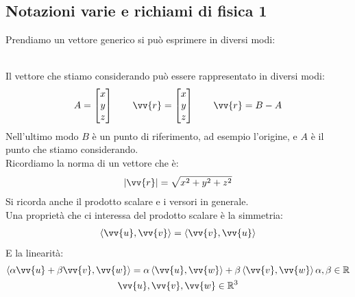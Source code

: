 \documentclass[a4paper, oneside]{article}
\begin{document}
\subsection{Notazioni varie e richiami di fisica 1}
Prendiamo un vettore generico si può esprimere in diversi modi:\\
\hfill\\
Il vettore che stiamo considerando può essere rappresentato in diversi modi:
\begin{gather*}
    A = \begin{bmatrix}
        x\\
        y\\
        z
    \end{bmatrix}\qquad
    \vv{r} = \begin{bmatrix}
        x\\
        y\\
        z
    \end{bmatrix}\qquad
    \vv{r} = B - A
\end{gather*}
Nell'ultimo modo $B$ è un punto di riferimento, ad esempio l'origine, e $A$ è il punto che stiamo considerando.\\
Ricordiamo la norma di un vettore che è:
\begin{gather*}
    |\vv{r}| = \sqrt{x^2 + y^2 + z^2}
\end{gather*}
Si ricorda anche il prodotto scalare e i versori in generale.\\
Una proprietà che ci interessa del prodotto scalare è la simmetria:
\begin{gather*}
    \left\langle \vv{u} , \vv{v} \right\rangle = \left\langle \vv{v} , \vv{u} \right\rangle
\end{gather*}
E la linearità:
\begin{gather*}
    \left\langle \alpha \vv{u} + \beta \vv{v} , \vv{w} \right\rangle = \alpha \left\langle \vv{u} , \vv{w} \right\rangle + \beta \left\langle \vv{v} , \vv{w} \right\rangle
    \alpha, \beta \in \mathbb{R}\\
    \vv{u} , \vv{v} , \vv{w} \in \mathbb{R}^3
\end{gather*}
\end{document}
